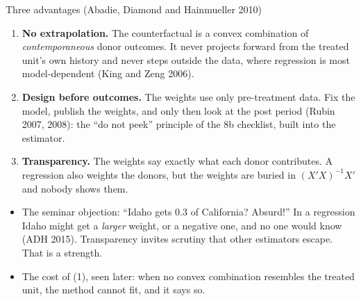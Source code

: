 \documentclass[
  11pt,
  ignorenonframetext,
  aspectratio=169,
]{beamer}
\providecommand{\tightlist}{%
  \setlength{\itemsep}{0pt}\setlength{\parskip}{0pt}}
\begin{document}
\begin{frame}{Three advantages (Abadie, Diamond and Hainmueller 2010)}
\protect{}\label{three-advantages-abadie-diamond-and-hainmueller-2010}
\begin{enumerate}
\tightlist
\item
  \textbf{No extrapolation.} The counterfactual is a convex combination
  of \emph{contemporaneous} donor outcomes. It never projects forward
  from the treated unit's own history and never steps outside the data,
  where regression is most model-dependent (King and Zeng 2006).
\item
  \textbf{Design before outcomes.} The weights use only pre-treatment
  data. Fix the model, publish the weights, and only then look at the
  post period (Rubin 2007, 2008): the ``do not peek'' principle of the
  8b checklist, built into the estimator.
\item
  \textbf{Transparency.} The weights say exactly what each donor
  contributes. A regression also weights the donors, but the weights are
  buried in \((X'X)^{-1}X'\) and nobody shows them.
\end{enumerate}

\vspace{0.4em}

\begin{itemize}
\tightlist
\item
  The seminar objection: ``Idaho gets 0.3 of California? Absurd!'' In a
  regression Idaho might get a \emph{larger} weight, or a negative one,
  and no one would know (ADH 2015). Transparency invites scrutiny that
  other estimators escape. That is a strength.
\item
  The cost of (1), seen later: when no convex combination resembles the
  treated unit, the method cannot fit, and it says so.
\end{itemize}
\end{frame}
\end{document}
